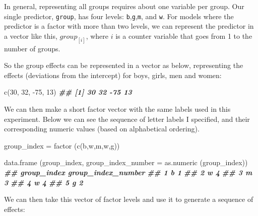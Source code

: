 \documentclass[
]{book}
\newenvironment{Shaded}{\begin{snugshade}}{\end{snugshade}}
\newcommand{\AttributeTok}[1]{\textcolor[rgb]{0.77,0.63,0.00}{#1}}
\newcommand{\DecValTok}[1]{\textcolor[rgb]{0.00,0.00,0.81}{#1}}
\newcommand{\DocumentationTok}[1]{\textcolor[rgb]{0.56,0.35,0.01}{\textbf{\textit{#1}}}}
\newcommand{\FunctionTok}[1]{\textcolor[rgb]{0.00,0.00,0.00}{#1}}
\newcommand{\NormalTok}[1]{#1}
\newcommand{\OtherTok}[1]{\textcolor[rgb]{0.56,0.35,0.01}{#1}}
\newcommand{\SpecialCharTok}[1]{\textcolor[rgb]{0.00,0.00,0.00}{#1}}
\newcommand{\StringTok}[1]{\textcolor[rgb]{0.31,0.60,0.02}{#1}}
\begin{document}
In general, representing all groups requires about one variable per group. Our single predictor, \texttt{group}, has four levels: \texttt{b},\texttt{g},\texttt{m}, and \texttt{w}. For models where the predictor is a factor with more than two levels, we can represent the predictor in a vector like this, \(group_{[i]}\), where \(i\) is a counter variable that goes from 1 to the number of groups.

So the group effects can be represented in a vector as below, representing the effects (deviations from the intercept) for boys, girls, men and women:

\begin{Shaded}
\begin{Highlighting}[]
\FunctionTok{c}\NormalTok{(}\DecValTok{30}\NormalTok{, }\DecValTok{32}\NormalTok{, }\SpecialCharTok{{-}}\DecValTok{75}\NormalTok{, }\DecValTok{13}\NormalTok{)}
\DocumentationTok{\#\# [1]  30  32 {-}75  13}
\end{Highlighting}
\end{Shaded}

We can then make a short factor vector with the same labels used in this experiment. Below we can see the sequence of letter labels I specified, and their corresponding numeric values (based on alphabetical ordering).

\begin{Shaded}
\begin{Highlighting}[]
\NormalTok{group\_index }\OtherTok{=} \FunctionTok{factor}\NormalTok{ (}\FunctionTok{c}\NormalTok{(}\StringTok{\textquotesingle{}b\textquotesingle{}}\NormalTok{,}\StringTok{\textquotesingle{}w\textquotesingle{}}\NormalTok{,}\StringTok{\textquotesingle{}m\textquotesingle{}}\NormalTok{,}\StringTok{\textquotesingle{}w\textquotesingle{}}\NormalTok{,}\StringTok{\textquotesingle{}g\textquotesingle{}}\NormalTok{))}

\FunctionTok{data.frame}\NormalTok{ (group\_index, }\AttributeTok{group\_index\_number =} \FunctionTok{as.numeric}\NormalTok{ (group\_index))}
\DocumentationTok{\#\#   group\_index group\_index\_number}
\DocumentationTok{\#\# 1           b                  1}
\DocumentationTok{\#\# 2           w                  4}
\DocumentationTok{\#\# 3           m                  3}
\DocumentationTok{\#\# 4           w                  4}
\DocumentationTok{\#\# 5           g                  2}
\end{Highlighting}
\end{Shaded}

We can then take this vector of factor levels and use it to generate a sequence of effects:
\end{document}
